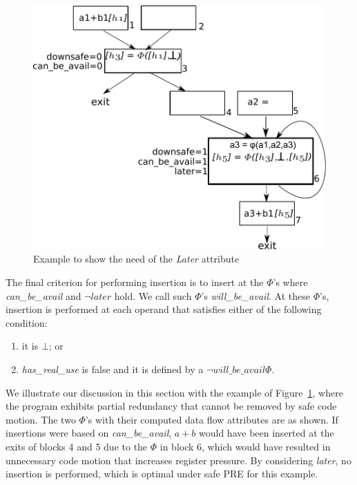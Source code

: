 \begin{figure}
\centering
\includegraphics[scale=0.45]{fig-later-example.pdf}
\caption{Example to show the need of the \emph{Later} attribute}
\label{fig: later-example}
\end{figure}

The final criterion for performing insertion is to insert at the $\Phi$'s where 
\emph{can\_be\_avail} and $\neg later$ hold.  We call such $\Phi$'s
\emph{will\_be\_avail}.  At these $\Phi$'s,
insertion is performed at each operand that satisfies either of the following
condition:
\begin{enumerate}
\item it is $\bot$; or
\item \emph{has\_real\_use} is false and it is defined by a 
$\neg will\_be\_avail \Phi$.
\end{enumerate}

We illustrate our discussion in this section with the example of 
Figure~\ref{fig: later-example}, where the program exhibits partial redundancy
that cannot be removed by safe code motion.  The two $\Phi$'s with their 
computed data flow attributes are as shown.  If insertions were based on
\emph{can\_be\_avail}, $a+b$ would have been inserted at the exits of 
blocks 4 and 5 due to the $\Phi$ in block 6,
which would have resulted in unnecessary code motion that increases
register pressure.  By considering \emph{later}, no insertion is performed,
which is optimal under safe PRE for this example.
 
